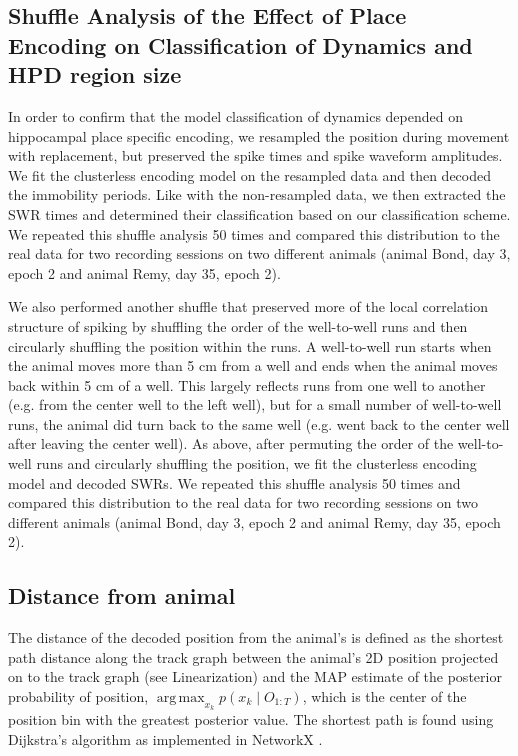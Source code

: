 \documentclass[9pt,lineno]{elife}
\DeclareMathOperator*{\argmax}{arg\,max}
\begin{document}
\subsection*{Shuffle Analysis of the Effect of Place Encoding on Classification of Dynamics and HPD region size}
In order to confirm that the model classification of dynamics depended on hippocampal place specific encoding, we resampled the position during movement with replacement, but preserved the spike times and spike waveform amplitudes. We fit the clusterless encoding model on the resampled data and then decoded the immobility periods. Like with the non-resampled data, we then extracted the SWR times and determined their classification based on our classification scheme. We repeated this shuffle analysis 50 times and compared this distribution to the real data for two recording sessions on two different animals (animal Bond, day 3, epoch 2 and animal Remy, day 35, epoch 2).

We also performed another shuffle that preserved more of the local correlation structure of spiking by shuffling the order of the well-to-well runs and then circularly shuffling the position within the runs. A well-to-well run starts when the animal moves more than 5 cm from a well and ends when the animal moves back within 5 cm of a well. This largely reflects runs from one well to another (e.g. from the center well to the left well), but for a small number of well-to-well runs, the animal did turn back to the same well (e.g. went back to the center well after leaving the center well). As above, after permuting the order of the well-to-well runs and circularly shuffling the position, we fit the clusterless encoding model and decoded SWRs. We repeated this shuffle analysis 50 times and compared this distribution to the real data for two recording sessions on two different animals (animal Bond, day 3, epoch 2 and animal Remy, day 35, epoch 2).

\subsection*{Distance from animal}
The distance of the decoded position from the animal's is defined as the shortest path distance along the track graph between the animal's 2D position projected on to the track graph (see Linearization) and the MAP estimate of the posterior probability of position, $\argmax_{x_k} p(x_{k} \mid O_{1:T})$, which is the center of the position bin with the greatest posterior value. The shortest path is found using Dijkstra's algorithm \citep{Dijkstranotetwoproblems1959} as implemented in NetworkX \citep{HagbergExploringNetworkStructure2008}.
\end{document}
